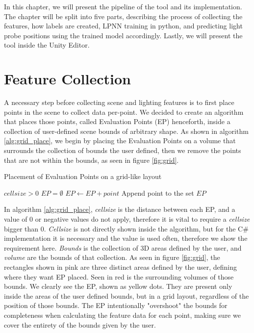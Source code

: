 In this chapter, we will present the pipeline of the tool and its implementation. The chapter will be split into five parts, describing the process of collecting the features, how labels are created, LPNN training in python, and predicting light probe positions using the trained model accordingly. Lastly, we will present the tool inside the Unity Editor.

\section{Feature Collection}
\label{sec:feature_collection}
A necessary step before collecting scene and lighting features is to first place points in the scene to collect data per-point. We decided to create an algorithm that places those points, called Evaluation Points (EP) henceforth, inside a collection of user-defined scene bounds of arbitrary shape. As shown in algorithm \ref{alg:grid_place}, we begin by placing the Evaluation Points on a volume that surrounds the collection of bounds the user defined, then we remove the points that are not within the bounds, as seen in figure \ref{fig:grid}.


\begin{algorithm}
	\caption{Placement of Evaluation Points on a grid-like layout}
	\label{alg:grid_place}
	\begin{algorithmic}[1]
		\Require $cellsize > 0$
		\State $EP = \emptyset$
				\State $EP \gets EP + point$ \Comment Append point to the set
			\EndIf
		\EndFor
		\State \Return $EP$
	\end{algorithmic}
\end{algorithm}

In algorithm \ref{alg:grid_place}, \textit{cellsize} is the distance between each EP, and a value of 0 or negative values do not apply, therefore it is vital to require a \textit{cellsize} bigger than 0. \textit{Cellsize} is not directly shown inside the algorithm, but for the C\# implementation it is necessary and the value is used often, therefore we show the requirement here. \textit{Bounds} is the collection of 3D areas defined by the user, and \textit{volume} are the bounds of that collection. As seen in figure \ref{fig:grid}, the rectangles shown in pink are three distinct areas defined by the user, defining where they want EP placed. Seen in red is the surrounding volumes of those bounds. We clearly see the EP, shown as yellow dots. They are present only inside the areas of the user defined bounds, but in a grid layout, regardless of the position of those bounds. The EP intentionally "overshoot" the bounds for completeness when calculating the feature data for each point, making sure we cover the entirety of the bounds given by the user.

